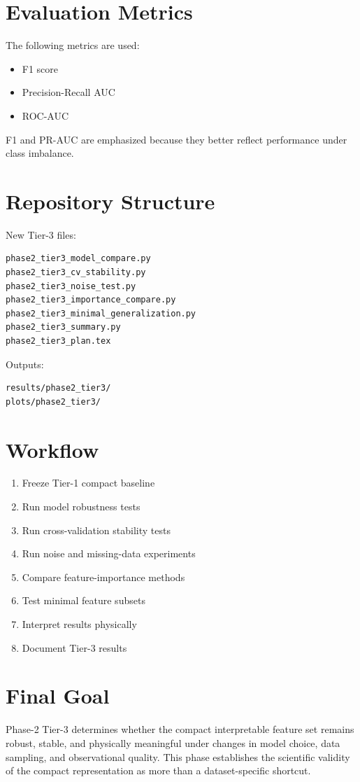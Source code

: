 \section{Evaluation Metrics}

The following metrics are used:
\begin{itemize}
\item F1 score
\item Precision-Recall AUC
\item ROC-AUC
\end{itemize}

F1 and PR-AUC are emphasized because they better reflect performance under
class imbalance.

\section{Repository Structure}

New Tier-3 files:
\begin{verbatim}
phase2_tier3_model_compare.py
phase2_tier3_cv_stability.py
phase2_tier3_noise_test.py
phase2_tier3_importance_compare.py
phase2_tier3_minimal_generalization.py
phase2_tier3_summary.py
phase2_tier3_plan.tex
\end{verbatim}

Outputs:
\begin{verbatim}
results/phase2_tier3/
plots/phase2_tier3/
\end{verbatim}

\section{Workflow}

\begin{enumerate}
\item Freeze Tier-1 compact baseline
\item Run model robustness tests
\item Run cross-validation stability tests
\item Run noise and missing-data experiments
\item Compare feature-importance methods
\item Test minimal feature subsets
\item Interpret results physically
\item Document Tier-3 results
\end{enumerate}

\section{Final Goal}

Phase-2 Tier-3 determines whether the compact interpretable feature set remains
robust, stable, and physically meaningful under changes in model choice, data
sampling, and observational quality. This phase establishes the scientific
validity of the compact representation as more than a dataset-specific shortcut.
